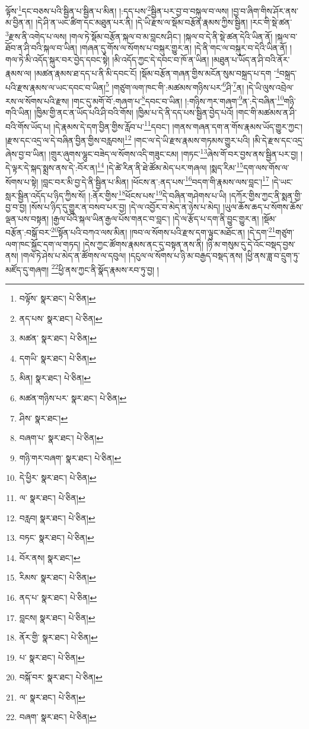 ལྟོས་\footnote{བལྟོས་  སྣར་ཐང་།  པེ་ཅིན། }དང་བཅས་པའི་སྦྱིན་པ་སྦྱིན་པ་མིན། །:དད་པས་\footnote{ནད་པས་  སྣར་ཐང་།  པེ་ཅིན། }སྦྱིན་པར་བྱ་བ་བསྐུལ་བ་ལས། །བྱ་བ་ཞིག་གིས་ཤོར་ནས་མ་བྱིན་ན། །དེ་ཤི་ན་ཡང་ཚིག་དང་མཐུན་པར་ནི། །དེ་ཡི་རྫས་ལ་སྡོམ་བརྩོན་རྣམས་ཀྱིས་སྦྱིན། །རང་གི་སྡེ་ཚན་\footnote{མཚན་  སྣར་ཐང་།  པེ་ཅིན། }རྫས་ནི་འགེད་པ་ལས། །གལ་ཏེ་སྡོམ་བརྩོན་སྐལ་བ་མ་བླངས་ཤིང་། །སྐལ་བ་དེ་ནི་སྡེ་ཚན་དེའི་ཡིན་ནོ། །སྐལ་བ་ཐོབ་ན་ཤི་བའི་སྐལ་བ་ཡིན། །གཞན་དུ་གོས་ལ་སོགས་པ་བསྐུར་གྱུར་ན། །དེ་ནི་གང་ལ་བསྐུར་བ་དེའི་ཡིན་ནོ། །གལ་ཏེ་མི་འདོད་སྐུར་བར་བྱེད་དབང་སྟེ། །མི་འདོད་ཀྱང་དེ་དབང་བ་ཁོ་ན་ཡིན། །མཐུན་པ་ཡོད་ན་ཤི་བའི་ནོར་རྣམས་ལ། །མཚན་རྣམས་ཐ་དད་པ་ནི་མི་དབང་ངོ། །སྡོམ་བརྩོན་གཞན་གྱིས་མངོན་སུམ་བསྐྲད་པ་དག ་\footnote{དགཡི་  སྣར་ཐང་།  པེ་ཅིན། }བསྐྲད་པའི་རྫས་རྣམས་ལ་ཡང་དབང་བ་ཡིན།\footnote{མིན།  སྣར་ཐང་།  པེ་ཅིན། } །གཙུག་ལག་ཁང་གི་:མཚམས་གཉིས་པར་\footnote{མཚན་གཉིས་པར་  སྣར་ཐང་།  པེ་ཅིན། }ཤི་\footnote{ཤིས་  སྣར་ཐང་། }ན། །དེ་ཡི་ལུས་འབྲེལ་རས་ལ་སོགས་པའི་རྫས། །གང་དུ་མགོ་བོ་:གཞག་པ་\footnote{བཞག་པ་  སྣར་ཐང་།  པེ་ཅིན། }དབང་བ་ཡིན། །:གཉིས་ཀར་གཞག་\footnote{གཉི་གར་བཞག་  སྣར་ཐང་།  པེ་ཅིན། }ན་:དེ་བཞིན་\footnote{དེ་ཕྱིར་  སྣར་ཐང་།  པེ་ཅིན། }གཉི་གའི་ཡིན། །ཁྱིམ་གྱི་ནང་ན་ཡོད་པའི་ཤི་བའི་གོས། །ཁྱིམ་པ་དེ་ནི་དད་པས་སྦྱིན་བྱེད་པའོ། །གང་གི་མཚམས་ན་ཤི་བའི་གོས་ཡོད་པ། །དེ་རྣམས་དེ་དག་བྱིན་གྱིས་རློབ་པ་\footnote{ལ་  སྣར་ཐང་།  པེ་ཅིན། }དབང་། །གནས་གཞན་དག་ན་གོས་རྣམས་ཡོད་གྱུར་ཀྱང་། །རྫས་དང་འདྲ་ལ་དེ་བཞིན་བྱིན་གྱིས་བརླབས།\footnote{བརླབ།  སྣར་ཐང་།  པེ་ཅིན། } །གང་ལ་དེ་ཡི་རྫས་རྣམས་གཏམས་གྱུར་པའི། །མི་དེ་རྫས་དང་འདྲ་ཞེས་བྱ་བ་ཡིན། །གྲུར་ཞུགས་ལྷུང་བཟེད་ལ་སོགས་འདི་གཟུང་ངམ། །གཏང་\footnote{བཏང་  སྣར་ཐང་།  པེ་ཅིན། }ཞེས་གོ་བར་བྱས་ནས་སྦྱིན་པར་བྱ། །དེ་ལྟར་དེ་སྐད་སྨྲས་ནས་དེ་:བོར་ན།\footnote{བོར་ནས།  སྣར་ཐང་། } །དེ་ཚེ་རིན་ནི་ཐེ་ཚོམ་མེད་པར་གཞལ། །སྨད་རིམ་\footnote{རིམས་  སྣར་ཐང་།  པེ་ཅིན། }དག་ལས་གོས་ལ་སོགས་པ་སྟེ། །བླང་བར་མི་བྱ་དེ་ནི་སྦྱིན་པ་མིན། །ཕོངས་ན་:ནད་པས་\footnote{ནད་པ་  སྣར་ཐང་།  པེ་ཅིན། }བདག་གི་རྣམས་ལས་བླང་།\footnote{བླངས།  སྣར་ཐང་།  པེ་ཅིན། } །དེ་ཡང་སླར་སྦྱིན་འདོད་པ་ཉིད་ཀྱིས་སོ། །:ནོར་གྱིས་\footnote{ནོར་གྱི་  སྣར་ཐང་།  པེ་ཅིན། }ཕོངས་པས་\footnote{པ་  སྣར་ཐང་།  པེ་ཅིན། }དེ་བཞིན་གཤེགས་པ་ཡི། །དཀོར་གྱིས་ཀྱང་ནི་སྨན་གྱི་བྱ་བ་བྱ། །སོས་པ་ཉིད་དུ་གྱུར་ན་བསབ་པར་བྱ། །དེ་ལ་འབྱོར་བ་མེད་ན་ཉེས་པ་མེད། །ཡུལ་ཆོས་ཆད་པ་སོགས་ཆོས་ལྡན་པས་བསྟན། །རྒྱལ་པོའི་སྐལ་ཡིན་རྒྱལ་པོས་གནང་བ་བླང་། །དེ་ལ་རྩོད་པ་དག་ནི་བྱུང་གྱུར་ན། །སྡོམ་བརྩོན་:བསྒོ་བར་\footnote{བསྐོ་བར་  སྣར་ཐང་།  པེ་ཅིན། }སྟོན་པའི་བཀའ་ལས་མིན། །ཁབ་ལ་སོགས་པའི་རྫས་དག་ལྟུང་མཐོང་ན། །དེ་དག་\footnote{ལ་  སྣར་ཐང་།  པེ་ཅིན། }གཙུག་ལག་ཁང་སྐྱོང་དག་ལ་གཏད། །དེས་ཀྱང་ཚོགས་རྣམས་ནང་དུ་བསྟན་ནས་ནི། །ཉི་མ་གསུམ་དུ་དེ་འོང་བསྡད་བྱས་ནས། །གལ་ཏེ་ཤེས་པ་མེད་ན་ཚོགས་ལ་དབུལ། །དངུལ་ལ་སོགས་པ་ཉི་མ་བརྒྱད་བསྡད་ནས། །ཕྱི་ནས་ཟླ་བ་དྲུག་ཏུ་མཛོད་དུ་གཞག། \footnote{བཞག་  སྣར་ཐང་།  པེ་ཅིན། }ཕྱི་ནས་ཀྱང་ནི་སྣོད་རྣམས་རབ་ཏུ་བྱ། །
